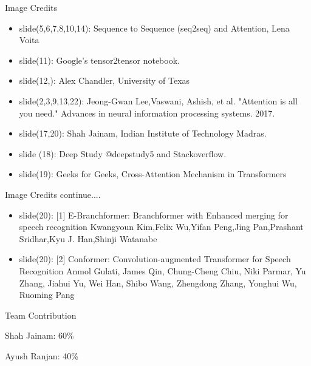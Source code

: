 \documentclass{beamer}
\begin{document}
\begin{frame}{Image Credits}
\begin{itemize}
    \item slide(5,6,7,8,10,14): Sequence to Sequence (seq2seq) and Attention, Lena Voita
    \item slide(11): Google's tensor2tensor notebook.
    \item slide(12,): Alex Chandler, University of Texas
    \item slide(2,3,9,13,22): Jeong-Gwan Lee,Vaswani, Ashish, et al. "Attention is all you need." Advances in neural information processing systems. 2017.
    \item slide(17,20): Shah Jainam, Indian Institute of Technology Madras.
    \item slide (18): Deep Study @deepstudy5 and Stackoverflow.
    \item slide(19): Geeks for Geeks, Cross-Attention Mechanism in Transformers
    \end{itemize}
    
\end{frame}

\begin{frame}{Image Credits continue....}
\begin{itemize}
    \item slide(20): [1] E-Branchformer: Branchformer with Enhanced merging for speech recognition Kwangyoun Kim,Felix Wu,Yifan Peng,Jing Pan,Prashant Sridhar,Kyu J. Han,Shinji Watanabe
    \item slide(20): [2] Conformer: Convolution-augmented Transformer for Speech Recognition Anmol Gulati, James Qin, Chung-Cheng Chiu, Niki Parmar, Yu Zhang, Jiahui Yu, Wei Han, Shibo Wang, Zhengdong Zhang, Yonghui Wu, Ruoming Pang
\end{itemize}
    
\end{frame}

\begin{frame}{Team Contribution}

Shah Jainam: 60\%

Ayush Ranjan: 40\%

    
\end{frame}

    
\end{document}
